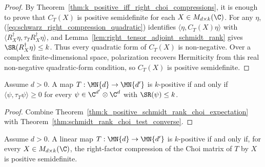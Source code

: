 \begin{proof}
    \leanok
    By Theorem~\ref{thm:k_positive_iff_right_choi_compressions}, it is enough
    to prove that $C_T(X)$ is positive semidefinite for each
    $X\in M_{d\times k}(\C)$. For any $\eta$,
    (\ref{eq:schwarz_right_compression_quadratic}) identifies
    $\langle\eta,C_T(X)\eta\rangle$ with
    $\langle R_X^\dagger\eta,\tau_T R_X^\dagger\eta\rangle$, and
    Lemma~\ref{lem:right_tensor_adjoint_schmidt_rank} gives
    $\SR(R_X^\dagger\eta)\le k$. Thus every quadratic form of $C_T(X)$ is
    non-negative. Over a complex finite-dimensional space, polarization
    recovers Hermiticity from this real non-negative quadratic-form condition,
    so $C_T(X)$ is positive semidefinite.
\end{proof}

\begin{theorem}
    \label{thm:schmidt_rank_choi_test_iff}
    \leanok
    Assume $d>0$. A map $T:\MN{d}\to\MN{d'}$ is $k$-positive if and only if
    $\langle\psi,\tau_T\psi\rangle\ge0$ for every
    $\psi\in\C^{d'}\otimes\C^d$ with $\SR(\psi)\le k$.
\end{theorem}

\begin{proof}
    \leanok
    Combine Theorem~\ref{thm:k_positive_schmidt_rank_choi_expectation} with
    Theorem~\ref{thm:schmidt_rank_choi_test_converse}.
\end{proof}
\begin{theorem}
    \label{thm:k_positive_iff_right_choi_compressions}
    \leanok
    Assume $d>0$. A linear map
    $T:\MN{d}\to\MN{d'}$ is $k$-positive if and only if, for every
    $X\in M_{d\times k}(\C)$, the right-factor compression of the Choi matrix of
    $T$ by $X$ is positive semidefinite.
\end{theorem}

